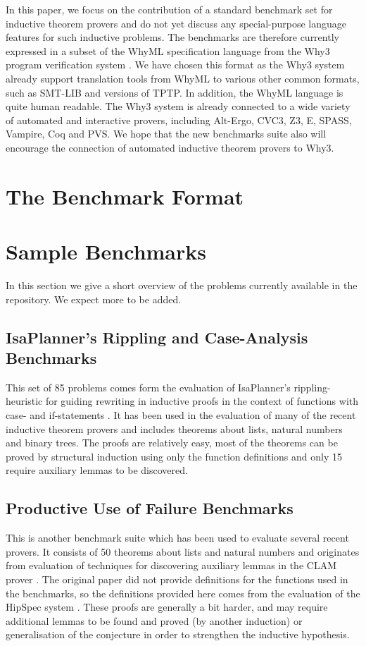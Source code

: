 \documentclass{llncs}
\begin{document}
In this paper, we focus on the contribution of a standard benchmark set for inductive theorem provers and do not yet discuss any special-purpose language features for such inductive problems. The benchmarks are therefore currently expressed in a subset of the WhyML specification language from the Why3 program verification system \cite{Why3}. We have chosen this format as the Why3 system already support translation tools from WhyML to various other common formats, such as SMT-LIB and versions of TPTP. 
In addition, the WhyML language is quite human readable.%
The Why3 system is already connected to a wide variety of automated and interactive provers, including  Alt-Ergo, CVC3, Z3, E, SPASS, Vampire, Coq and PVS. We hope that the new benchmarks suite also will encourage the connection of automated inductive theorem provers to Why3. 


\section{The Benchmark Format}
\label{sec:format}

\section{Sample Benchmarks}
In this section we give a short overview of the problems currently available in the repository. We expect more to be added.

\subsection{IsaPlanner's Rippling and Case-Analysis Benchmarks}
This set of 85 problems comes form the evaluation of IsaPlanner's rippling-heuristic for guiding rewriting in inductive proofs in the context of functions with case- and if-statements \cite{IsaPcase}. It has been used in the evaluation of many of the recent inductive theorem provers and includes theorems about lists, natural numbers and binary trees. The proofs are relatively easy, most of the theorems can be proved by structural induction using only the function definitions and only 15 require auxiliary lemmas to be discovered.

\subsection{Productive Use of Failure Benchmarks}
This is another benchmark suite which has been used to evaluate several recent provers. It consists of 50 theorems about lists and natural numbers and originates from evaluation of techniques for discovering auxiliary lemmas in the CLAM prover \cite{productiveuse}. The original paper did not provide definitions for the functions used in the benchmarks, so the definitions provided here comes from the evaluation of the HipSpec system \cite{hipspecCADE}. These proofs are generally a bit harder, and may require additional lemmas to be found and proved (by another induction) or generalisation of the conjecture in order to strengthen the inductive hypothesis. 
\end{document}
